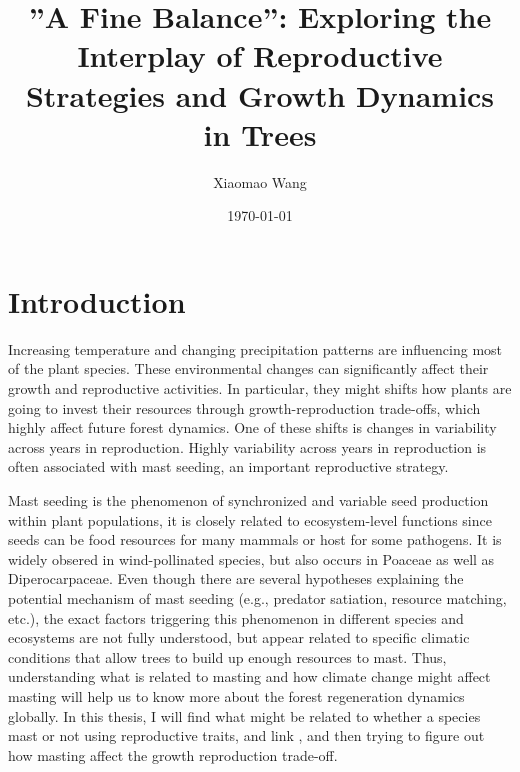 \documentclass[11pt,letter]{article}
\begin{document}

\renewcommand{\refname}{\CHead{}}

\title{”A Fine Balance'': Exploring the Interplay of Reproductive Strategies and Growth Dynamics in Trees}
\author{Xiaomao Wang} 
\date{\today}
\maketitle

\setlength{\parindent}{0pt}
\setlength{\parskip}{3pt}

\section{Introduction}
Increasing temperature and changing precipitation patterns are influencing most of the plant species. These environmental changes can significantly affect their growth and reproductive activities. In particular, they might shifts how plants are going to invest their resources through growth-reproduction trade-offs, which highly affect future forest dynamics. One of these shifts is changes in variability across years in reproduction. Highly variability across years in reproduction is often associated with mast seeding, an important reproductive strategy.\par
Mast seeding is the phenomenon of synchronized and variable seed production within plant populations, it is closely related to ecosystem-level functions since seeds can be food resources for many mammals or host for some pathogens. It is widely obsered in wind-pollinated species, but also occurs in Poaceae as well as Diperocarpaceae. Even though there are several hypotheses explaining the potential mechanism of mast seeding (e.g., predator satiation, resource matching, etc.), the exact factors triggering this phenomenon in different species and ecosystems are not fully understood, but appear related to specific climatic conditions that allow trees to build up enough resources to mast. Thus, understanding what is related to masting and how climate change might affect masting will help us to know more about the forest regeneration dynamics globally. In this thesis, I will find what might be related to whether a species mast or not using reproductive traits, and link , and then trying to figure out how masting affect the growth reproduction trade-off.
\end{document}
